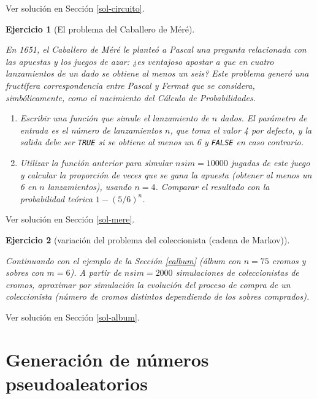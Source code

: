 \documentclass[
  10pt,
]{book}
\theoremstyle{break}
\newtheorem{exercise}{Ejercicio}[chapter]
\theoremstyle{nonumberplain}
\begin{document}
Ver solución en Sección \ref{sol-circuito}.

\begin{exercise}[El problema del Caballero de Méré]
\protect\hypertarget{exr:mere}{}\label{exr:mere}

En 1651, el Caballero de Méré le planteó a Pascal una pregunta
relacionada con las apuestas y los juegos de azar: ¿es ventajoso
apostar a que en cuatro lanzamientos de un dado se obtiene al menos
un seis? Este problema generó una fructífera correspondencia entre
Pascal y Fermat que se considera, simbólicamente, como el nacimiento
del Cálculo de Probabilidades.

\begin{enumerate}
\def\labelenumi{\alph{enumi})}
\item
  Escribir una función que simule el lanzamiento de \(n\) dados. El
  parámetro de entrada es el número de lanzamientos \(n\), que toma
  el valor 4 por defecto, y la salida debe ser \texttt{TRUE} si se
  obtiene al menos un 6 y \texttt{FALSE} en caso contrario.
\item
  Utilizar la función anterior para simular \(nsim=10000\) jugadas
  de este juego y calcular la proporción de veces que se gana la
  apuesta (obtener al menos un 6 en \(n\) lanzamientos), usando
  \(n=4\). Comparar el resultado con la probabilidad teórica
  \(1-(5/6)^{n}\).
\end{enumerate}

\end{exercise}

Ver solución en Sección \ref{sol-mere}.

\begin{exercise}[variación del problema del coleccionista (cadena de Markov)]
\protect\hypertarget{exr:album}{}\label{exr:album}

Continuando con el ejemplo de la Sección \ref{ealbum}
(álbum con \(n = 75\) cromos y sobres con \(m = 6\)). A partir de \(nsim=2000\) simulaciones de coleccionistas de cromos, aproximar por simulación la evolución del proceso de compra de un coleccionista (número de cromos distintos dependiendo de los sobres comprados).
\end{exercise}

Ver solución en Sección \ref{sol-album}.

\hypertarget{gen-pseudo}{%
\chapter{Generación de números pseudoaleatorios}\label{gen-pseudo}}
\end{document}
